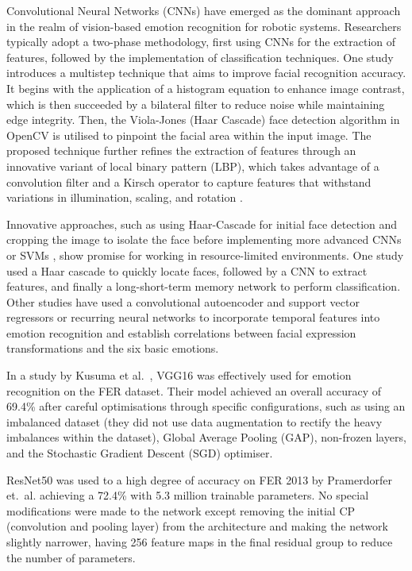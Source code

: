 Convolutional Neural Networks (CNNs) have emerged as the dominant approach in the realm of vision-based emotion recognition for robotic systems. Researchers typically adopt a two-phase methodology, first using CNNs for the extraction of features, followed by the implementation of classification techniques. One study introduces a multistep technique that aims to improve facial recognition accuracy. It begins with the application of a histogram equation to enhance image contrast, which is then succeeded by a bilateral filter to reduce noise while maintaining edge integrity. Then, the Viola-Jones (Haar Cascade) face detection algorithm in OpenCV is utilised to pinpoint the facial area within the input image. The proposed technique further refines the extraction of features through an innovative variant of local binary pattern (LBP), which takes advantage of a convolution filter and a Kirsch operator to capture features that withstand variations in illumination, scaling, and rotation \cite{Mistry2020-gr}.

Innovative approaches, such as using Haar-Cascade for initial face detection and cropping the image to isolate the face before implementing more advanced CNNs \cite{Appuhamy2018-dc} or SVMs \cite{Gupta2018-af} \cite{Rosula_Reyes2020-yz}, show promise for working in resource-limited environments. One study used a Haar cascade to quickly locate faces, followed by a CNN to extract features, and finally a long-short-term memory network \cite{8760246} to perform classification. Other studies have used a convolutional autoencoder and support vector regressors \cite{Allognon2020-um} or recurring neural networks \cite{Brandizzi2021AutomaticRI} to incorporate temporal features into emotion recognition and establish correlations between facial expression transformations and the six basic emotions.

In a study by Kusuma et al.\ \cite{Kusuma2020-oa}, VGG16 was effectively used for emotion recognition on the FER dataset. Their model achieved an overall accuracy of 69.4\% after careful optimisations through specific configurations, such as using an imbalanced dataset (they did not use data augmentation to rectify the heavy imbalances within the dataset), Global Average Pooling (GAP), non-frozen layers, and the Stochastic Gradient Descent (SGD) optimiser.

ResNet50 was used to a high degree of accuracy on FER 2013 by Pramerdorfer et.\ al. \cite{Pramerdorfer2016-xx} achieving a 72.4\% with 5.3 million trainable parameters. No special modifications were made to the network except removing the initial CP (convolution and pooling layer) from the architecture and making the network slightly narrower, having 256 feature maps in the final residual group to reduce the number of parameters.

